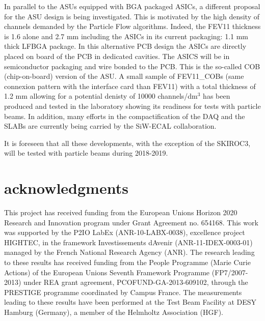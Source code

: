\documentclass[final,3p,times,twocolumn]{elsarticle}
\begin{document}
In parallel to the ASUs equipped with BGA packaged ASICs, a different proposal for the ASU
design is being investigated. This is motivated by the high density of channels
demanded by the Particle Flow algorithms. Indeed, the FEV11 thickness is 1.6 alone and 2.7 mm
including the ASICs in its current packaging: 1.1 mm thick LFBGA package.
In this alternative PCB design the ASICs
are directly placed on board of the PCB in dedicated cavities.
The ASICS will be in semiconductor packaging and wire bonded to the PCB. This is the so-called COB (chip-on-board) version of the ASU.
A small sample of FEV11\_COBs (same connexion pattern with the interface card than FEV11)
with a total thickness of 1.2 mm allowing for a potential denisty of 10000 channels/dm$^{3}$ has been produced and tested in the laboratory
showing its readiness for tests with particle beams.%
In addition, many efforts in the compactification of
the DAQ and the SLABs are currently being carried by the SiW-ECAL collaboration.

It is foreseen that all these developments, with the exception of the SKIROC3, will be tested with particle beams during 2018-2019.


\section*{acknowledgments}

This project has received funding from the European Union{\textquotesingle}s Horizon 2020 Research and Innovation program under Grant Agreement no. 654168.
This work was supported by the P2IO LabEx (ANR-10-LABX-0038), excellence project HIGHTEC,
in the framework {\textquotesingle}Investissements d{\textquotesingle}Avenir{\textquotesingle}
(ANR-11-IDEX-0003-01) managed by the French National Research Agency (ANR).
The research leading to these results has received funding from the People Programme (Marie
Curie Actions) of the European Union{\textquotesingle}s Seventh Framework Programme (FP7/2007-2013)
under REA grant agreement, PCOFUND-GA-2013-609102, through the PRESTIGE
programme coordinated by Campus France.
The measurements leading to these results have been performed at the Test Beam Facility at DESY Hamburg (Germany), a member of the Helmholtz Association (HGF).


%


\end{document}
